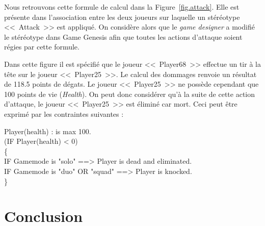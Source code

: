 Nous retrouvons cette formule de calcul dans la Figure~\ref{fig.attack}.
Elle est présente dans l'association entre les deux joueurs sur laquelle un stéréotype <<~Attack~>> est appliqué.
On considère alors que le \emph{game designer} a modifié le stéréotype dans Game Genesis afin que toutes les actions d'attaque soient régies par cette formule.

Dans cette figure il est spécifié que le joueur <<~Player68~>> effectue un tir à la tête sur le joueur <<~Player25~>>.
Le calcul des dommages renvoie un résultat de 118.5 points de dégats.
Le joueur <<~Player25~>> ne possède cependant que 100 points de vie (\emph{Health}).
On peut donc considérer qu'à la suite de cette action d'attaque, le joueur <<~Player25~>> est éliminé car mort.
Ceci peut être exprimé par les contraintes suivantes :

\begin{table}[H]
\footnotesize
\begin{framed}

    Player(health) : is max 100.\\
    (IF Player(health) < 0)\\
    \{\\
    IF Gamemode is "solo" ==> Player is dead and eliminated.\\
    IF Gamemode is "duo" OR "squad" ==> Player is knocked.\\
    \}
    
\end{framed}
\end{table}

\section{Conclusion}
